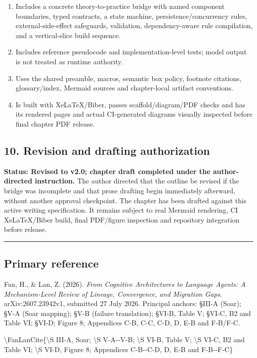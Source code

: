 \begin{enumerate}
\item
  Includes a concrete theory-to-practice bridge with named component boundaries, typed contracts, a state machine, persistence/concurrency rules, external-side-effect safeguards, validation, dependency-aware rule compilation, and a vertical-slice build sequence.
\item
  Includes reference pseudocode and implementation-level tests; model output is not treated as runtime authority.
\item
  Uses the shared preamble, macros, semantic box policy, footnote citations, glossary/index, Mermaid sources and chapter-local artifact conventions.
\item
  Is built with XeLaTeX/Biber, passes scaffold/diagram/PDF checks and has its rendered pages and actual CI-generated diagrams visually inspected before final chapter PDF release.
\end{enumerate}

\subsection{10. Revision and drafting authorization}\label{10-revision-and-drafting-authorization}

\textbf{Status: Revised to v2.0; chapter draft completed under the author-directed instruction.} The author directed that the outline be revised if the bridge was incomplete and that prose drafting begin immediately afterward, without another approval checkpoint. The chapter has been drafted against this active writing specification. It remains subject to real Mermaid rendering, CI XeLaTeX/Biber build, final PDF/figure inspection and repository integration before release.

\begin{center}\rule{0.5\linewidth}{0.5pt}\end{center}

\subsection{Primary reference}\label{primary-reference}

Fan, H., \& Lan, Z. (2026). \emph{From Cognitive Architectures to Language Agents: A Mechanism-Level Review of Lineage, Convergence, and Migration Gaps}. arXiv:2607.23942v1, submitted 27 July 2026. Principal anchors: §III-A (Soar); §V-A (Soar mapping); §V-B (failure translation); §VI-B, Table V; §VI-C, B2 and Table VI; §VI-D; Figure 8; Appendices C-B, C-C, C-D, D, E-B and F-B/F-C.

\textbackslash FanLanCite\{\textbackslash S III-A, Soar; \textbackslash S V-A-\/-V-B; \textbackslash S VI-B, Table V; \textbackslash S VI-C, B2 and Table VI; \textbackslash S VI-D, Figure 8; Appendices C-B-\/-C-D, D, E-B and F-B-\/-F-C\}
